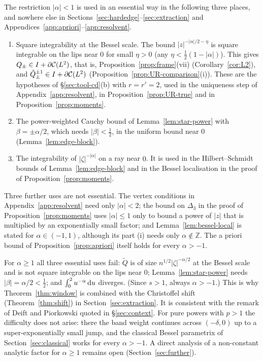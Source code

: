 \begin{remark}\label{rem:alpha-ge-1}
The restriction $|\alpha|<1$ is used in an essential way in the following three places, and nowhere else in
Sections~\ref{sec:hardedge}--\ref{sec:extraction} and Appendices~\ref{app:apriori}--\ref{app:resolvent}.
\begin{enumerate}
\item[(a)] Square integrability at the Bessel scale. The bound $|z|^{-|\alpha|/2-\eta}$ is square integrable on the lips
  near $0$ for small $\eta>0$ (any $\eta<\frac12(1-|\alpha|)$). This gives $Q_\pm\in I+\partial\mathcal{C}(L^2)$, that is,
  Proposition~\ref{prop:frame}(vii) (Corollary~\ref{cor:L2}), and $\tilde Q_\pm^{\pm1}\in I+\partial\mathcal{C}(L^2)$
  (Proposition~\ref{prop:UR-comparison}(i)). These are the hypotheses of \S\ref{sec:tool-cd}(b) with $r=r'=2$, used in
  the uniqueness step of Appendix~\ref{app:resolvent}, in Proposition~\ref{prop:UR-true} and in
  Proposition~\ref{prop:moments}.
\item[(b)] The power-weighted Cauchy bound of Lemma~\ref{lem:star-power} with $\beta=\pm\alpha/2$, which needs
  $|\beta|<\frac12$, in the uniform bound near $0$ (Lemma~\ref{lem:edge-block}).
\item[(c)] The integrability of $|\zeta|^{-|\alpha|}$ on a ray near $0$. It is used in the Hilbert--Schmidt
  bounds of Lemma~\ref{lem:edge-block} and in the Bessel localisation in the proof of
  Proposition~\ref{prop:moments}.
\end{enumerate}
Three further uses are not essential. The vertex conditions in Appendix~\ref{app:resolvent} need only $|\alpha|<2$; the
bound on $\Delta_3$ in the proof of Proposition~\ref{prop:moments} uses $|\alpha|\le1$ only to bound a power of $|z|$
that is multiplied by an exponentially small factor; and Lemma~\ref{lem:bessel-local} is stated for
$\alpha\in(-1,1)$, although its part (i) needs only $\alpha\notin\mathbb Z$. The a priori bound of
Proposition~\ref{prop:apriori} itself holds for every $\alpha>-1$.

For $\alpha\ge1$ all three essential uses fail: $\tilde Q$ is of size $n^{1/2}|\zeta|^{-\alpha/2}$ at the Bessel scale
and is not square integrable on the lips near $0$; Lemma~\ref{lem:star-power} needs $|\beta|=\alpha/2<\frac12$; and
$\int_0^2u^{-\alpha}\,\mathrm{d} u$ diverges. (Since $s>1$, always $\alpha>-1$.) This is why Theorem~\ref{thm:window} is
combined with the Christoffel shift (Theorem~\ref{thm:shift}) in Section~\ref{sec:extraction}. It is consistent with
the remark of Deift and Piorkowski \cite[\S1]{DP} quoted in \S\ref{sec:context}. For pure powers with $p>1$ the
difficulty does not arise: there the band weight continues across $(-\delta,0)$ up to a super-exponentially small
jump, and the classical Bessel parametrix of Section~\ref{sec:classical} works for every $\alpha>-1$. A direct analysis
of a non-constant analytic factor for $\alpha\ge1$ remains open (Section~\ref{sec:further}).
\end{remark}

